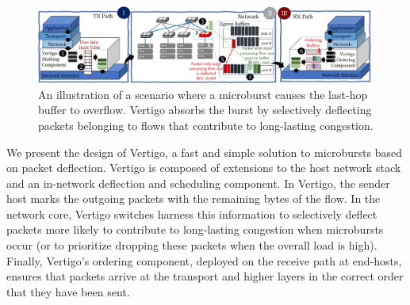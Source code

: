 \label{sec:v2}

\begin{figure}[t]
	\centering
	\includegraphics[width=0.99\textwidth]{figs/design-crop.pdf}
	\caption{\small{An illustration of a scenario where a microburst causes the last-hop buffer to overflow. Vertigo absorbs the burst by selectively deflecting packets belonging to flows that contribute to long-lasting congestion.} }
	\label{fig:v2}
\end{figure}

We present the design of Vertigo, a fast and simple solution to microbursts based on packet deflection. Vertigo is composed of extensions to the host network stack and an in-network deflection and scheduling component. In Vertigo, the sender host marks the outgoing packets with the remaining bytes of the flow. In the network core, Vertigo switches harness this information to selectively deflect packets more likely to contribute to long-lasting congestion when microbursts occur (or to prioritize dropping these packets when the overall load is high). Finally, Vertigo's ordering component, deployed on the receive path at end-hosts, ensures that packets arrive at the transport and higher layers in the correct order that they have been sent. %

